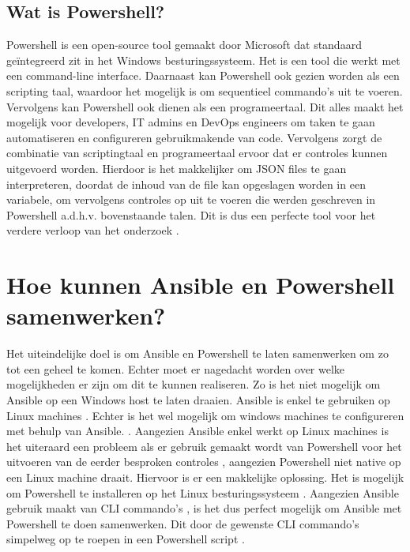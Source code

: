 \subsection{Wat is Powershell?}
Powershell is een open-source tool gemaakt door Microsoft dat standaard geïntegreerd zit in het Windows besturingssysteem. Het is een tool die werkt met een command-line interface. Daarnaast kan Powershell ook gezien worden als een scripting taal, waardoor het mogelijk is om sequentieel commando's uit te voeren. Vervolgens kan Powershell ook dienen als een programeertaal. Dit alles maakt het mogelijk voor developers, IT admins en DevOps engineers om taken te gaan automatiseren en configureren gebruikmakende van code. Vervolgens zorgt de combinatie van scriptingtaal en programeertaal ervoor dat er controles kunnen uitgevoerd worden. Hierdoor is het makkelijker om JSON files te gaan interpreteren, doordat de inhoud van de file kan opgeslagen worden in een variabele, om vervolgens controles op uit te voeren die werden geschreven in Powershell a.d.h.v. bovenstaande talen.  Dit is dus een perfecte tool voor het verdere verloop van het onderzoek \autocite{BasuMallick2022}.

\section{Hoe kunnen Ansible en Powershell samenwerken?}
Het uiteindelijke doel is om Ansible en Powershell te laten samenwerken om zo tot een geheel te komen. Echter moet er nagedacht worden over welke mogelijkheden er zijn om dit te kunnen realiseren. Zo is het niet mogelijk om Ansible op een Windows host te laten draaien. Ansible is enkel te gebruiken op Linux machines  \autocite{Hat2020}. Echter is het wel mogelijk om windows machines te configureren met behulp van Ansible. \autocite{Ansible2023} . Aangezien Ansible enkel werkt op Linux machines is het uiteraard een probleem als er gebruik gemaakt wordt van Powershell voor het uitvoeren van de eerder besproken controles , aangezien Powershell niet native op een Linux machine draait. 
Hiervoor is er een makkelijke oplossing. Het is mogelijk om Powershell te installeren op het Linux besturingssysteem \autocite{MicrosoftAnsible2023}. Aangezien Ansible gebruik maakt van CLI commando's , is het dus perfect mogelijk om Ansible met Powershell te doen samenwerken. Dit door de gewenste CLI commando's simpelweg op te roepen in een Powershell script \autocite{Ansible2023}.

